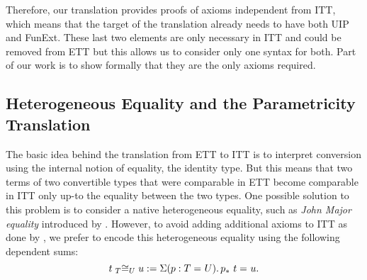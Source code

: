 Therefore, our translation provides proofs of axioms independent from
ITT, which means that the target of the translation already needs to
have both UIP and FunExt.
These last two elements are only necessary in ITT and could be removed from ETT
but this allows us to consider only one syntax for both.
%
Part of our work is to show formally that they are the only axioms
required.

\subsection{Heterogeneous Equality and the Parametricity Translation}
\label{sec:heteq}

The basic idea behind the translation from ETT to ITT is to interpret
conversion using the internal notion of equality, \ie the identity type.
%
But this means that two terms of two convertible types that were comparable
in ETT become comparable in ITT only up-to the equality between the
two types. One possible solution to this problem is to consider a
native heterogeneous equality, such as \emph{John Major
equality} introduced by .
%
However, to avoid adding additional axioms to ITT as done by
, we prefer to encode this
heterogeneous equality using the following dependent sums:
$$\Heq{T}{t}{U}{u} := \Sum{p:\Eq{}{T}{U}} \Eq{}{\translpo{p}\ t}{u}.$$
%

